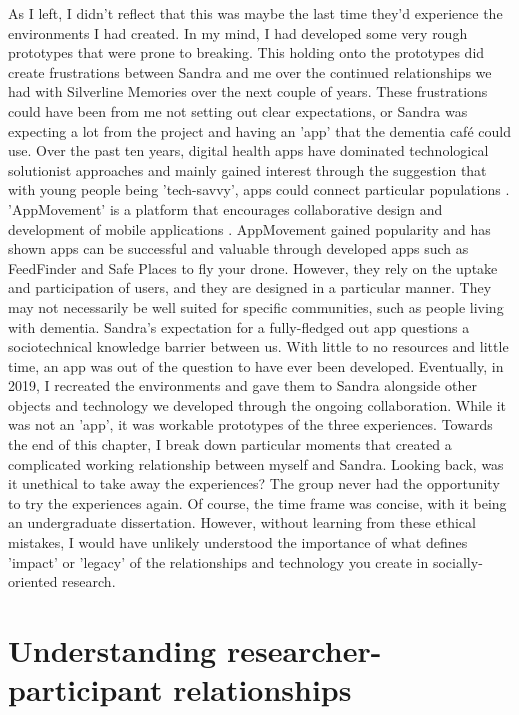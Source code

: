 As I left, I didn't reflect that this was maybe the last time they'd experience the environments I had created. In my mind, I had developed some very rough prototypes that were prone to breaking. This holding onto the prototypes did create frustrations between Sandra and me over the continued relationships we had with Silverline Memories over the next couple of years.  These frustrations could have been from me not setting out clear expectations, or Sandra was expecting a lot from the project and having an 'app' that the dementia café could use. Over the past ten years, digital health apps have dominated technological solutionist approaches and mainly gained interest through the suggestion that with young people being 'tech-savvy', apps could connect particular populations \citep{byron_apps_2019}. 'AppMovement' is a platform that encourages collaborative design and development of mobile applications \citep{garbett_app_2016}. AppMovement gained popularity and has shown apps can be successful and valuable through developed apps such as FeedFinder \citep{balaam_feedfinder_2015} and Safe Places to fly your drone.
However, they rely on the uptake and participation of users, and they are designed in a particular manner. They may not necessarily be well suited for specific communities, such as people living with dementia. Sandra's expectation for a fully-fledged out app questions a sociotechnical knowledge barrier between us. With little to no resources and little time, an app was out of the question to have ever been developed.  Eventually, in 2019, I recreated the environments and gave them to Sandra alongside other objects and technology we developed through the ongoing collaboration. While it was not an 'app', it was workable prototypes of the three experiences. Towards the end of this chapter, I break down particular moments that created a complicated working relationship between myself and Sandra. Looking back, was it unethical to take away the experiences? The group never had the opportunity to try the experiences again. Of course, the time frame was concise, with it being an undergraduate dissertation. However, without learning from these ethical mistakes, I would have unlikely understood the importance of what defines 'impact' or 'legacy' of the relationships and technology you create in socially-oriented research. 

\section{Understanding researcher-participant relationships}
\label{Relationships:researcherParticipant}

